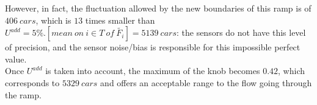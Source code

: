 However, in fact, the fluctuation allowed by the new boundaries of this ramp is of $406\ cars$, which is $13$ times smaller than $U^{add}=5 \% .[mean\ on\ i\in T\ of\ \widetilde{F_{i}}]=5139\ cars$: the sensors do not have this level of precision, and the sensor noise/bias is responsible for this impossible perfect value. \\
Once $U^{add}$ is taken into account, the maximum of the knob becomes $0.42$, which corresponds to $5329\ cars$  and offers an acceptable range to the flow going through the ramp.\\